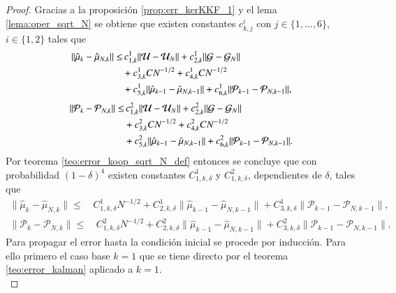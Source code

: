 \begin{proof}
	Gracias a la proposición \ref{prop:err_kerKKF_1} y el lema \ref{lema:oper_sqrt_N} se obtiene que existen constantes $c_{k,j}^i$ con $j \in \{ 1, \dots, 6\}$, $i \in \{ 1, 2\}$ tales que
	\begin{equation*}
		\begin{aligned}
			\| \hat \mu_{k} - \hat \mu_{N,k}  \| \leq & \, c_{1,k}^1 \| \mathcal{U} - \mathcal{U}_N \| +  c_{2,k}^1 \| \mathcal{G} - \mathcal{G}_N \| \\ 
			&+ c_{3,k}^1 C N^{-1/2}+c_{4,k}^1 C N^{-1/2} \\
			& + c_{5,k}^1 \| \hat \mu_{k-1} - \hat \mu_{N, k-1} \| + c_{6,k}^1 \| \mathcal{P}_{k-1} - \mathcal{P}_{N, k-1} \|,
		\end{aligned}
	\end{equation*}
	\begin{equation*}
		\begin{aligned}
			\| \mathcal{P}_{k} - \mathcal{P}_{N,k} \| \leq & \, c_{1,k}^2 \| \mathcal{U} - \mathcal{U}_N \| +  c_{2,k}^2 \| \mathcal{G} - \mathcal{G}_N \| \\ 
			&+ c_{3,k}^2 C N^{-1/2}+c_{4,k}^2 C N^{-1/2} \\
			& + c_{5,k}^2 \| \hat \mu_{k-1} - \hat \mu_{N, k-1} \| + c_{6,k}^2 \| \mathcal{P}_{k-1} - \mathcal{P}_{N, k-1} \|.
		\end{aligned}
	\end{equation*}
	Por teorema \ref{teo:error_koop_sqrt_N_def} entonces se concluye que con probabilidad $(1-\delta)^4$ existen constantes $C^1_{1, k, \delta}$ y $C^2_{1, k, \delta}$, dependientes de $\delta$, tales que
	\begin{equation*}
		\begin{aligned}
			\| \hat \mu_{k} - \hat \mu_{N,k}  \| \leq & \, C_{1,k, \delta}^1 N^{-1/2} + C_{2,k, \delta}^1 \| \hat \mu_{k-1} - \hat \mu_{N, k-1} \| + C_{3,k, \delta}^1 \| \mathcal{P}_{k-1}  - \mathcal{P}_{N, k-1}  \|,
		\end{aligned}
	\end{equation*}
	\begin{equation*}
		\begin{aligned}
			\| \mathcal{P}_{k} - \mathcal{P}_{N,k}  \| \leq & \, C_{1,k, \delta}^2 N^{-1/2} + C_{2,k, \delta}^2 \| \hat \mu_{k-1} - \hat \mu_{N, k-1} \| + C_{3,k, \delta}^2 \| \mathcal{P}_{k-1} - \mathcal{P}_{N,k-1} \|.
		\end{aligned}
	\end{equation*}
	Para propagar el error hasta la condición inicial se procede por inducción. Para ello primero el caso base $k=1$ que se tiene directo por el teorema \ref{teo:error_kalman} aplicado a $k=1$.\\

\end{proof}
